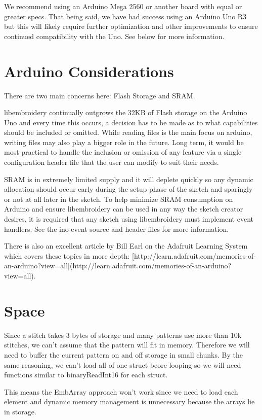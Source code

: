 \documentclass{report}
\begin{document}
We recommend using an Arduino Mega 2560 or another board with equal or
greater specs. That being said, we have had success using an Arduino Uno
R3 but this will likely require further optimization and other
improvements to ensure continued compatibility with the Uno. See below
for more information.

\section{Arduino Considerations}

There are two main concerns here: Flash Storage and SRAM.

libembroidery continually outgrows the 32KB of Flash storage on the
Arduino Uno and every time this occurs, a decision has to be made as to
what capabilities should be included or omitted. While reading files is
the main focus on arduino, writing files may also play a bigger role in
the future. Long term, it would be most practical to handle the
inclusion or omission of any feature via a single configuration header
file that the user can modify to suit their needs.

SRAM is in extremely limited supply and it will deplete quickly so any
dynamic allocation should occur early during the setup phase of the
sketch and sparingly or not at all later in the sketch. To help minimize
SRAM consumption on Arduino and ensure libembroidery can be used in any
way the sketch creator desires, it is required that any sketch using
libembroidery must implement event handlers. See the ino-event source
and header files for more information.

There is also an excellent article by Bill Earl on the Adafruit Learning
System which covers these topics in more depth:
[http://learn.adafruit.com/memories-of-an-arduino?view=all](http://learn.adafruit.com/memories-of-an-arduino?view=all).

\section{Space}

Since a stitch takes 3 bytes of storage and many patterns use more than
10k stitches, we can't assume that the pattern will fit in memory. Therefore
we will need to buffer the current pattern on and off storage in small
chunks. By the same reasoning, we can't load all of one struct beore
looping so we will need functions similar to binaryReadInt16 for each
struct.

This means the EmbArray approach won't work since we need to load
each element and dynamic memory management is unnecessary because
the arrays lie in storage.
\end{document}
